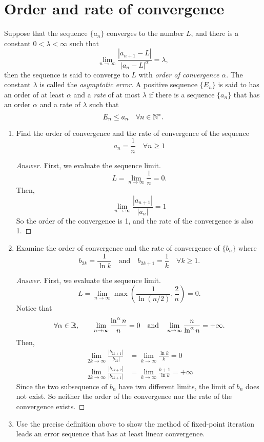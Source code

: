 \section{Order and rate of convergence}
Suppose that the sequence \(\{a_n\}\) converges to the number $L$, and there is a constant \(0<\lambda<\infty\) such that
\[ \lim_{n\to\infty} \frac{|a_{n+1}-L|}{|a_n-L|^\alpha}=\lambda, \]
then the sequence is said to converge to $L$ with \emph{order of convergence} $\alpha$.
The constant $\lambda$ is called the \emph{asymptotic error}.
A positive sequence \(\{E_n\}\) is said to has an order of at least $\alpha$ and a \emph{rate} of at most $\lambda$ if there is a sequence \(\{a_n\}\) that has an order $\alpha$ and a rate of $\lambda$ such that
\[ E_n\leq a_n \quad \forall n\in\mathbb{N}^*. \]
\begin{enumerate}
	\item Find the order of convergence and the rate of convergence of the sequence
	\[ a_n=\frac{1}{n} \quad \forall n\geq1 \]
	\begin{proof}[Answer]
	First, we evaluate the sequence limit.
	\[ L=\lim_{n\to\infty}\frac{1}{n}=0. \]
	Then,
	\[ \lim_{n\to\infty}\frac{|a_{n+1}|}{|a_n|}=1 \]
	So the order of the convergence is 1, and the rate of the convergence is also 1.
	\end{proof}
	\item Examine the order of convergence and the rate of convergence of \(\{b_n\}\) where
	\[ b_{2k}=\frac{1}{\ln k} \quad \text{and} \quad b_{2k+1}=\frac{1}{k} \quad \forall k\geq1. \]
	\begin{proof}[Answer]
	First, we evaluate the sequence limit.
	\[ L=\lim_{n\to\infty}\max\left(\frac{1}{\ln (n/2)},\frac{2}{n}\right)=0. \]
	Notice that
	\[ \forall \alpha\in\mathbb{R},\qquad \lim_{n\to\infty}\frac{\ln^\alpha n}{n}=0 \quad\text{and}\quad \lim_{n\to\infty}\frac{n}{\ln^\alpha n}=+\infty. \]
	Then,
	\begin{align*}
		\lim_{2k\to\infty}\frac{|b_{2k+1}|}{|b_{2k}|}&=\lim_{k\to\infty}\frac{\ln k}{k}=0\\
		\lim_{2k\to\infty}\frac{|b_{2k+2}|}{|b_{2k+1}|}&=\lim_{k\to\infty}\frac{k+1}{\ln k}=+\infty
	\end{align*}
	Since the two subsequence of \(b_n\) have two different limits, the limit of \(b_n\) does not exist.
	So neither the order of the convergence nor the rate of the convergence exists.
	\end{proof}
	\item Use the precise definition above to show the method of fixed-point iteration leads an error sequence that has at least linear convergence.

\end{enumerate}
